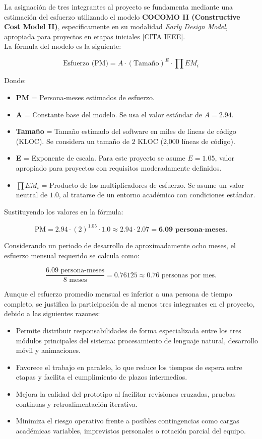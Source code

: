 La asignación de tres integrantes al proyecto se fundamenta mediante una estimación del esfuerzo utilizando el modelo \textbf{COCOMO II (Constructive Cost Model II)}, específicamente en su modalidad \textit{Early Design Model}, apropiada para proyectos en etapas iniciales [CITA IEEE].\\

La fórmula del modelo es la siguiente:

\[
\text{Esfuerzo (PM)} = A \cdot (\text{Tamaño})^E \cdot \prod EM_i
\]

Donde:

\begin{itemize}
	\item \textbf{PM} = Persona-meses estimados de esfuerzo.
	\item \textbf{A} = Constante base del modelo. Se usa el valor estándar de $A = 2.94$.
	\item \textbf{Tamaño} = Tamaño estimado del software en miles de líneas de código (KLOC). Se considera un tamaño de $2$ KLOC (2,000 líneas de código).
	\item \textbf{E} = Exponente de escala. Para este proyecto se asume $E = 1.05$, valor apropiado para proyectos con requisitos moderadamente definidos.
	\item $\prod EM_i$ = Producto de los multiplicadores de esfuerzo. Se asume un valor neutral de $1.0$, al tratarse de un entorno académico con condiciones estándar.
\end{itemize}

Sustituyendo los valores en la fórmula:

\[
\text{PM} = 2.94 \cdot (2)^{1.05} \cdot 1.0 \approx 2.94 \cdot 2.07 = \textbf{6.09 persona-meses.}
\]

Considerando un periodo de desarrollo de aproximadamente ocho meses, el esfuerzo mensual requerido se calcula como:

\[
\frac{6.09 \text{ persona-meses}}{8 \text{ meses}} = \num{0.76125} \approx \num{0.76} \text{ personas por mes.}
\]

Aunque el esfuerzo promedio mensual es inferior a una persona de tiempo completo, se justifica la participación de al menos tres integrantes en el proyecto, debido a las siguientes razones:

\begin{itemize}
	\item Permite distribuir responsabilidades de forma especializada entre los tres módulos principales del sistema: procesamiento de lenguaje natural, desarrollo móvil y animaciones.
	\item Favorece el trabajo en paralelo, lo que reduce los tiempos de espera entre etapas y facilita el cumplimiento de plazos intermedios.
	\item Mejora la calidad del prototipo al facilitar revisiones cruzadas, pruebas continuas y retroalimentación iterativa.
	\item Minimiza el riesgo operativo frente a posibles contingencias como cargas académicas variables, imprevistos personales o rotación parcial del equipo.
\end{itemize}


